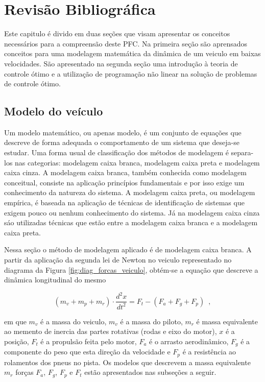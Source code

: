 \chapter[Revisão Bibliográfica]{Revisão Bibliográfica}
\label{chap:revisao}
\thispagestyle{empty}

Este capitulo é divido em duas seções que visam apresentar os conceitos necessários para a compreensão deste PFC.
Na primeira seção são aprensados conceitos para uma modelagem matemática da dinâmica de um veiculo em baixas velocidades.
São apresentado na segunda seção uma introdução à teoria de controle ótimo e a utilização de programação não linear na solução
de problemas de controle ótimo.

\section{Modelo do veículo}
\label{sec:modelo}

Um modelo matemático, ou apenas modelo, é um conjunto de equações que descreve de forma adequada o comportamento de um sistema que deseja-se estudar.
Uma forma usual de classificação dos métodos de modelagem é separa-los nas categorias: modelagem caixa branca, modelagem caixa preta e modelagem
caixa cinza.
A modelagem caixa branca, também conhecida como modelagem conceitual, consiste na aplicação princípios fundamentais e por isso exige um conhecimento
da natureza do sistema.
A modelagem caixa preta, ou modelagem empírica, é baseada na aplicação de técnicas de identificação de sistemas que exigem pouco ou
nenhum conhecimento do sistema.
Já na modelagem caixa cinza sáo utilizadas técnicas que estão entre a modelagem caixa branca e a modelagem caixa preta\cite{book:Aguirre}.

Nessa seção o método de modelagem aplicado é de modelagem caixa branca. A partir da aplicação da segunda lei de Newton no
veiculo representado no diagrama da Figura \ref{fig:diag_forcas_veiculo}, obtém-se a equação que descreve a dinâmica longitudinal do mesmo

\begin{equation}
	\label{eq:SomaForcas}
	(m_v + m_p + m_r) \cdot \frac{d^2x}{dt^2} = F_t - (F_a + F_g + F_p)
	\enspace,
\end{equation}

em que $m_v$ é a massa do veiculo, $m_v$ é a massa do piloto,  $m_r$ é massa equivalente ao memento de inercia das partes rotativas (rodas e eixo do motor),  $x$ é a posição, $F_{t}$ é a propulsão feita pelo motor, $F_{a}$ é o
arrasto aerodinâmico, $F_g$ é a componente do peso que esta direção da velocidade e $F_{p}$ é a resistência ao rolamentos dos pneus no pista.
Os modelos que descrevem a massa equivalente $m_r$ forças $F_{a}$, $F_g$, $F_{p}$ e $F_{t}$ estão apresentados nas subseções a seguir.

